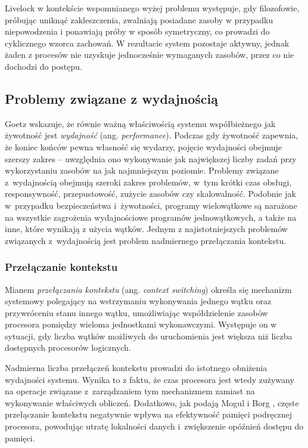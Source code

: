 Livelock w kontekście wspomnianego wyżej problemu występuje, gdy filozofowie, próbując uniknąć zakleszczenia, zwalniają posiadane zasoby w przypadku niepowodzenia i ponawiają próby w sposób symetryczny, co prowadzi do cyklicznego wzorca zachowań. W rezultacie system pozostaje aktywny, jednak żaden z procesów nie uzyskuje jednocześnie wymaganych zasobów, przez co nie dochodzi do postępu.

\subsection{Problemy związane z wydajnością}
\label{sec:performance-issues}
Goetz \cite{goetz2006} wskazuje, że równie ważną właściwością systemu współbieżnego jak żywotność jest \emph{wydajność} (ang. \emph{performance}). Podczas gdy żywotność zapewnia, że koniec końców pewna własność się wydarzy, pojęcie wydajności obejmuje szerszy zakres -- uwzględnia ono wykonywanie jak największej liczby zadań przy wykorzystaniu zasobów na jak najmniejszym poziomie. Problemy związane z~wydajnością obejmują szeroki zakres problemów, w~tym krótki czas obsługi, responsywność, przepustowość, zużycie zasobów czy skalowalność. Podobnie jak w~przypadku bezpieczeństwa i~żywotności, programy wielowątkowe są narażone na wszystkie zagrożenia wydajnościowe programów jednowątkowych, a także na inne, które wynikają z użycia wątków. Jednym z najistotniejszych problemów związanych z~wydajnością jest problem nadmiernego przełączania kontekstu.

\subsubsection{Przełączanie kontekstu}
Mianem \emph{przełączania kontekstu} (ang. \emph{context switching}) określa się mechanizm systemowy polegający na wstrzymaniu wykonywania jednego wątku oraz przywróceniu stanu innego wątku, umożliwiając współdzielenie zasobów procesora pomiędzy wieloma jednostkami wykonawczymi. Występuje on w sytuacji, gdy liczba wątków możliwych do uruchomienia jest większa niż liczba dostępnych procesorów logicznych. \cite{goetz2006}

Nadmierna liczba przełączeń kontekstu prowadzi do istotnego obniżenia wydajności systemu. Wynika to z faktu, że czas procesora jest wtedy zużywany na operacje związane z~zarządzaniem tym mechanizmem zamiast na wykonywanie właściwych obliczeń. Dodatkowo, jak podają Mogul i Borg \cite{mogul1991}, częste przełączanie kontekstu negatywnie wpływa na efektywność pamięci podręcznej procesora, powodując utratę lokalności danych i~zwiększenie opóźnień dostępu do pamięci.

